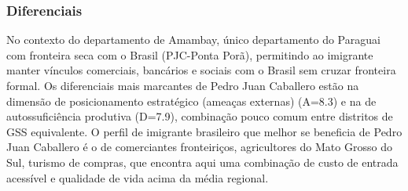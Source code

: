 \subsubsection*{Diferenciais}\label{dif-pedro-juan-caballero-1301}
No contexto do departamento de Amambay, único departamento do Paraguai com fronteira seca com o Brasil (PJC-Ponta Porã), permitindo ao imigrante manter vínculos comerciais, bancários e sociais com o Brasil sem cruzar fronteira formal. Os diferenciais mais marcantes de Pedro Juan Caballero estão na dimensão de posicionamento estratégico (ameaças externas) (A=8.3) e na de autossuficiência produtiva (D=7.9), combinação pouco comum entre distritos de GSS equivalente. O perfil de imigrante brasileiro que melhor se beneficia de Pedro Juan Caballero é o de comerciantes fronteiriços, agricultores do Mato Grosso do Sul, turismo de compras, que encontra aqui uma combinação de custo de entrada acessível e qualidade de vida acima da média regional.
